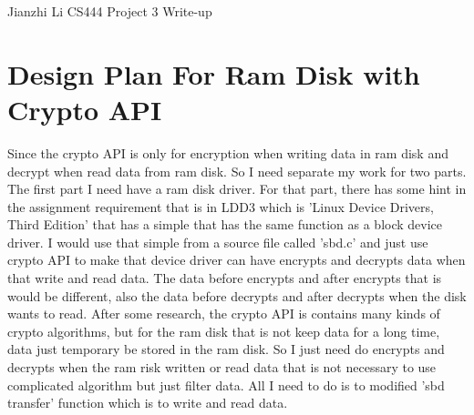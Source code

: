 \documentclass[letterpaper,11pt,titlepage]{article}
\begin{document}
Jianzhi Li\newline
CS444 Project 3 Write-up

\section{Design Plan For Ram Disk with Crypto API}

Since the crypto API is only for encryption when writing data in ram disk and decrypt when read data from ram disk.
So I need separate my work for two parts. The first part I need have a ram disk driver. For that part, there has some hint
in the assignment requirement that is in LDD3 which is 'Linux Device Drivers, Third Edition' that has a simple that has the
same function as a block device driver. I would use that simple from a source file called 'sbd.c' and just use crypto API to make that device driver can have 
encrypts and decrypts data  when that write and read data. The data before encrypts and after encrypts that is would be different, also
the data before decrypts and after decrypts when the disk wants to read. After some research, the crypto API is contains many kinds of crypto
algorithms, but for the ram disk that is not keep data for a long time, data just temporary be stored in the ram disk. So I just need do encrypts and 
decrypts when the ram risk written or read data that is not necessary to use complicated algorithm but just filter data. All I need to do is to modified 'sbd transfer'  function which is to write and read data. 
    
\end{document}
